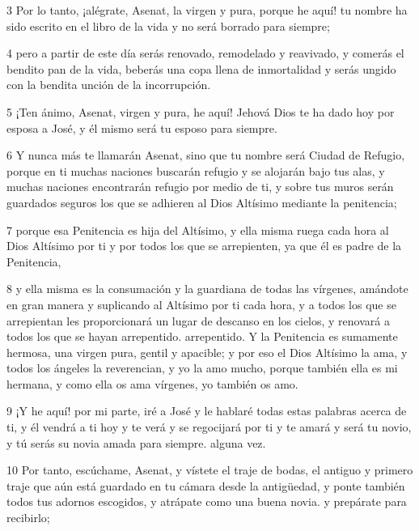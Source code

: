 \par 3 Por lo tanto, ¡alégrate, Asenat, la virgen y pura, porque he aquí! tu nombre ha sido escrito en el libro de la vida y no será borrado para siempre;

\par 4 pero a partir de este día serás renovado, remodelado y reavivado, y comerás el bendito pan de la vida, beberás una copa llena de inmortalidad y serás ungido con la bendita unción de la incorrupción.

\par 5 ¡Ten ánimo, Asenat, virgen y pura, he aquí! Jehová Dios te ha dado hoy por esposa a José, y él mismo será tu esposo para siempre.

\par 6 Y nunca más te llamarán Asenat, sino que tu nombre será Ciudad de Refugio, porque en ti muchas naciones buscarán refugio y se alojarán bajo tus alas, y muchas naciones encontrarán refugio por medio de ti, y sobre tus muros serán guardados seguros los que se adhieren al Dios Altísimo mediante la penitencia;

\par 7 porque esa Penitencia es hija del Altísimo, y ella misma ruega cada hora al Dios Altísimo por ti y por todos los que se arrepienten, ya que él es padre de la Penitencia,

\par 8 y ella misma es la consumación y la guardiana de todas las vírgenes, amándote en gran manera y suplicando al Altísimo por ti cada hora, y a todos los que se arrepientan les proporcionará un lugar de descanso en los cielos, y renovará a todos los que se hayan arrepentido. arrepentido. Y la Penitencia es sumamente hermosa, una virgen pura, gentil y apacible; y por eso el Dios Altísimo la ama, y ​​todos los ángeles la reverencian, y yo la amo mucho, porque también ella es mi hermana, y como ella os ama vírgenes, yo también os amo.

\par 9 ¡Y he aquí! por mi parte, iré a José y le hablaré todas estas palabras acerca de ti, y él vendrá a ti hoy y te verá y se regocijará por ti y te amará y será tu novio, y tú serás su novia amada para siempre. alguna vez.

\par 10 Por tanto, escúchame, Asenat, y vístete el traje de bodas, el antiguo y primero traje que aún está guardado en tu cámara desde la antigüedad, y ponte también todos tus adornos escogidos, y atrápate como una buena novia. y prepárate para recibirlo;

